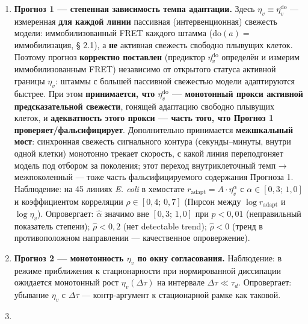 \documentclass[pdflatex,sn-mathphys-ay]{sn-jnl}
\providecommand{\tightlist}{\setlength{\itemsep}{0pt}\setlength{\parskip}{0pt}}
\begin{document}
\begin{enumerate}
\def\labelenumi{\arabic{enumi}.}
\tightlist
\item
  \textbf{Прогноз 1 --- степенная зависимость темпа адаптации.} Здесь \(\eta_v \equiv \eta_v^{\mathrm{do}}\) --- измеренная \textbf{для каждой линии} пассивная (интервенционная) свежесть модели: иммобилизованный FRET каждого штамма (\(\mathrm{do}(a) =\) иммобилизация, § 2.1), а \textbf{не} активная свежесть свободно плывущих клеток. Поэтому прогноз \textbf{корректно поставлен} (предиктор \(\eta_v^{\mathrm{do}}\) определён и измерим иммобилизованным FRET) независимо от открытого статуса активной границы \(\eta_v\): штаммы с большей пассивной свежестью модели адаптируются быстрее. При этом \textbf{принимается, что \(\eta_v^{\mathrm{do}}\) --- монотонный прокси активной предсказательной свежести}, гонящей адаптацию свободно плывущих клеток, и \textbf{адекватность этого прокси --- часть того, что Прогноз 1 проверяет/фальсифицирует}. Дополнительно принимается \textbf{межшкальный мост}: синхронная свежесть сигнального контура (секунды--минуты, внутри одной клетки) монотонно трекает скорость, с какой линия переподгоняет модель под отбором за поколения; этот переход внутриклеточный темп → межпоколенный --- тоже часть фальсифицируемого содержания Прогноза 1. Наблюдение: на 45 линиях \emph{E. coli} в хемостате \(r_{\text{adapt}} = A \cdot \eta_v^{\alpha}\) с \(\alpha \in [0{,}3;\, 1{,}0]\) и коэффициентом корреляции \(\rho \in [0{,}4;\, 0{,}7]\) (Пирсон между \(\log r_{\text{adapt}}\) и \(\log \eta_v\)). Опровергает: \(\hat{\alpha}\) значимо вне \([0{,}3;\, 1{,}0]\) при \(p < 0{,}01\) (неправильный показатель степени); \(\hat{\rho} < 0{,}2\) (нет detectable trend); \(\hat{\rho} < 0\) (тренд в противоположном направлении --- качественное опровержение).
\item
  \textbf{Прогноз 2 --- монотонность \(\eta_v\) по окну согласования.} Наблюдение: в режиме приближения к стационарности при нормированной диссипации ожидается монотонный рост \(\eta_v(\Delta\tau)\) на интервале \(\Delta\tau \ll \tau_d\). Опровергает: убывание \(\eta_v\) с \(\Delta\tau\) --- контр-аргумент к стационарной рамке как таковой.
\item

\end{enumerate}
\end{document}
